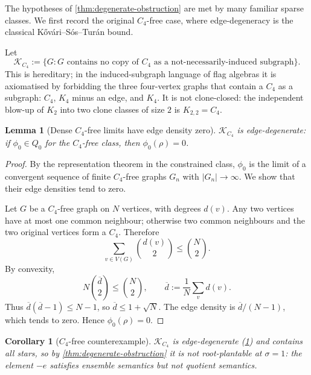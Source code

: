 \documentclass[11pt]{article}
\newtheorem{lemma}[theorem]{Lemma}
\newtheorem{corollary}[theorem]{Corollary}
\theoremstyle{definition}
\newcommand{\K}{\mathcal{K}}
\begin{document}
The hypotheses of \cref{thm:degenerate-obstruction} are met by many familiar
sparse classes.  We first record the original $C_4$-free case, where edge-degeneracy
is the classical K\H{o}v\'ari--S\'os--Tur\'an bound.

Let
\[
  \K_{C_4}:=\{G:\text{$G$ contains no copy of $C_4$ as a not-necessarily-induced subgraph}\}.
\]
This is hereditary; in the induced-subgraph language of flag algebras it is
axiomatised by forbidding the three four-vertex graphs that contain a $C_4$ as a
subgraph: $C_4$, $K_4$ minus an edge, and $K_4$.  It is not clone-closed: the
independent blow-up of $K_2$ into two clone classes of size $2$ is $K_{2,2}=C_4$.

\begin{lemma}[Dense \texorpdfstring{$C_4$}{C4}-free limits have edge density zero]\label{lem:c4-edge-zero}
$\K_{C_4}$ is edge-degenerate: if $\phi_0\in Q_0$ for the $C_4$-free class, then
$\phi_0(\rho)=0$.
\end{lemma}

\begin{proof}
By the representation theorem in the constrained class, $\phi_0$ is the limit
of a convergent sequence of finite $C_4$-free graphs $G_n$ with $|G_n|\to\infty$.
We show that their edge densities tend to zero.

Let $G$ be a $C_4$-free graph on $N$ vertices, with degrees $d(v)$.  Any two
vertices have at most one common neighbour; otherwise two common neighbours and
the two original vertices form a $C_4$.  Therefore
\[
  \sum_{v\in V(G)} \binom{d(v)}{2}
  \le
  \binom{N}{2}.
\]
By convexity,
\[
  N\binom{\overline d}{2}
  \le
  \binom{N}{2},
  \qquad
  \overline d:=\frac1N\sum_v d(v).
\]
Thus $\overline d(\overline d-1)\le N-1$, so
$\overline d\le 1+\sqrt N$.  The edge density is
$\overline d/(N-1)$, which tends to zero.  Hence
$\phi_0(\rho)=0$.
\end{proof}

\begin{corollary}[\texorpdfstring{$C_4$}{C4}-free counterexample]\label{cor:c4-counterexample}
$\K_{C_4}$ is edge-degenerate (\cref{lem:c4-edge-zero}) and contains all stars,
so by \cref{thm:degenerate-obstruction} it is not root-plantable at
$\sigma=1$: the element $-e$ satisfies ensemble semantics but not quotient
semantics.
\end{corollary}
\end{document}
